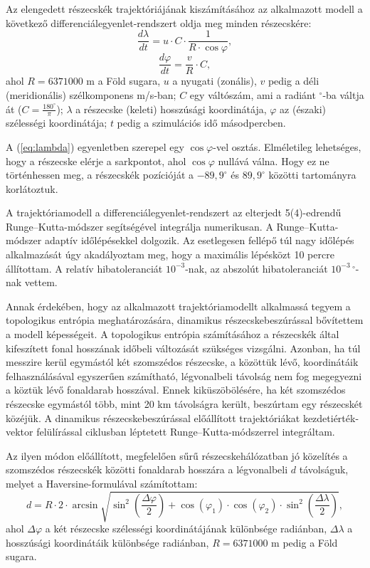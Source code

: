 \documentclass[12pt,a4paper]{article}
\begin{document}
Az elengedett részecskék trajektóriájának kiszámításához az alkalmazott modell a következő dif\-fe\-ren\-ci\-ál\-egyen\-let-rend\-szert oldja meg minden részecskére:
\begin{equation}\label{eq:lambda}
\frac{d \lambda}{d t} = u\cdot C \cdot \frac{1}{R \cdot \cos \varphi},
\end{equation}
\begin{equation}\label{eq:phi}
\frac{d \varphi}{d t} = \frac{v}{R} \cdot C,
\end{equation}
ahol $R=6371000$ m a Föld sugara, $u$ a nyugati (zonális), $v$ pedig a déli (meridionális) szélkomponens m/s-ban; $C$ egy váltószám, ami a radiánt $^\circ$-ba váltja át ($C=\frac{180 ^\circ}{\pi}$); $\lambda$ a részecske (keleti) hosszúsági koordinátája, $\varphi$ az (északi) szélességi koordinátája; $t$ pedig a szimulációs idő másodpercben. 

A (\ref{eq:lambda}) egyenletben szerepel egy $\cos \varphi$-vel osztás. Elméletileg lehetséges, hogy a részecske elérje a sarkpontot, ahol $\cos \varphi$ nullává válna. Hogy ez ne történhessen meg, a részecskék pozícióját a $-89,9^\circ$ és $89,9^\circ$ közötti tartományra korlátoztuk. 

A trajektóriamodell a differenciálegyenlet-rendszert az elterjedt 5(4)-edrendű Runge--Kutta-módszer segítségével integrálja numerikusan. A Runge--Kutta-módszer adaptív időlépésekkel dolgozik. Az esetlegesen fellépő túl nagy időlépés alkalmazását úgy akadályoztam meg, hogy a maximális lépésközt 10 percre állítottam. A relatív hibatoleranciát $10^{-3}$-nak, az abszolút hibatoleranciát $10^{-3}\,{}^\circ$-nak vettem.

Annak érdekében, hogy az alkalmazott trajektóriamodellt alkalmassá tegyem a topologikus entrópia meghatározására, dinamikus részecskebeszúrással bővítettem a modell képességeit. A topologikus entrópia számításához a részecskék által kifeszített fonal hosszának időbeli változását szükséges vizsgálni. Azonban, ha túl messzire kerül egymástól két szomszédos részecske, a közöttük lévő, koordinátáik felhasználásával egyszerűen számítható, légvonalbeli távolság nem fog megegyezni a köztük lévő fonaldarab hosszával. Ennek kiküszöbölésére, ha két szomszédos részecske egymástól több, mint 20 km távolságra került, beszúrtam egy részecskét közéjük. A dinamikus részecskebeszúrással előállított trajektóriákat kezdetiérték-vektor felülírással ciklusban léptetett Runge--Kutta-módszerrel integráltam.

Az ilyen módon előállított, megfelelően sűrű részecskehálózatban jó közelítés a szomszédos részecskék közötti fonaldarab hosszára a légvonalbeli $d$ távolságuk, melyet a Haversine-formulával számítottam:
\[
d=R \cdot 2 \cdot \arcsin \sqrt{\sin^2\left(\frac{\Delta \varphi}{2} \right) + \cos \left(\varphi_1 \right)\cdot\cos(\varphi_2)\cdot\sin^2\left(\frac{\Delta \lambda}{2} \right)},
\]
ahol $\Delta \varphi$ a két részecske szélességi koordinátájának különbsége radiánban, $\Delta \lambda$ a hosszúsági koordinátáik különbsége radiánban, $R=6371000$ m pedig a Föld sugara.
\end{document}
